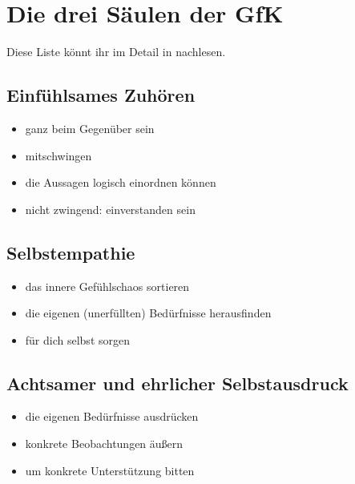 \section{Die drei Säulen der GfK}
\label{gfk-saeulen}

Diese Liste könnt ihr im Detail in \cite[S. 33f]{gfk-dummies} nachlesen.


\subsection{Einfühlsames Zuhören}

\begin{itemize}
 \item ganz beim Gegenüber sein
 \item mitschwingen
 \item die Aussagen logisch einordnen können
 \item nicht zwingend: einverstanden sein
\end{itemize}


\subsection{Selbstempathie}

\begin{itemize}
 \item das innere Gefühlschaos sortieren
 \item die eigenen (unerfüllten) Bedürfnisse herausfinden
 \item für dich selbst sorgen
\end{itemize}


\subsection{Achtsamer und ehrlicher Selbstausdruck}

\begin{itemize}
 \item die eigenen Bedürfnisse ausdrücken
 \item konkrete Beobachtungen äußern
 \item um konkrete Unterstützung bitten
\end{itemize}
